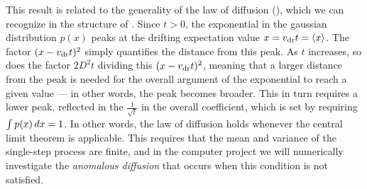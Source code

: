 This result is related to the generality of the law of diffusion (), which we can recognize in the structure of .
Since $t > 0$, the exponential in the gaussian distribution $p(x)$ peaks at the drifting expectation value $x = v_{\mathrm{dr}} t = \left\langle x \right\rangle$.
The factor $(x - v_{\mathrm{dr}} t)^2$ simply quantifies the distance from this peak.
As $t$ increases, so does the factor $2D^2 t$ dividing this $(x - v_{\mathrm{dr}} t)^2$, meaning that a larger distance from the peak is needed for the overall argument of the exponential to reach a given value --- in other words, the peak becomes broader.
This in turn requires a lower peak, reflected in the $\frac{1}{\sqrt{t}}$ in the overall coefficient, which is set by requiring $\int p(x) \mathop{dx} = 1$.
In other words, the law of diffusion holds whenever the central limit theorem is applicable.
This requires that the mean and variance of the single-step process are finite, and in the computer project we will numerically investigate the \textit{anomalous diffusion} that occurs when this condition is not satisfied.
